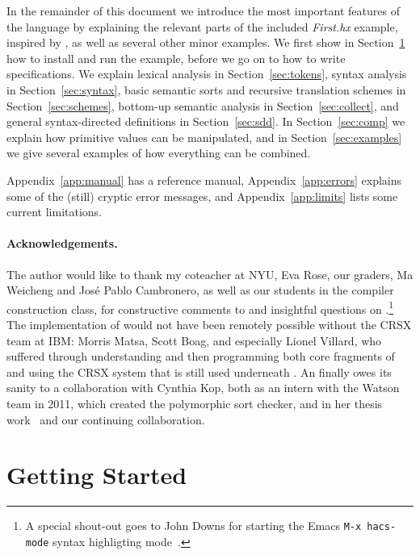 \documentclass[11pt]{article} %
\begin{document}
In the remainder of this document we introduce the most important features of the \HAX language by
explaining the relevant parts of the included \emph{First.hx} example, inspired by
\cite[Figure~1.7]{Aho+:2006}, as well as several other minor examples. %
We first show in Section~\ref{sec:run} how to install \HAX and run the example, before we go on to
how to write specifications. %
We explain lexical analysis in Section~\ref{sec:tokens}, %
syntax analysis in Section~\ref{sec:syntax}, %
basic semantic sorts and recursive translation schemes in Section~\ref{sec:schemes}, %
bottom-up semantic analysis in Section~\ref{sec:collect}, %
and general syntax-directed definitions in Section~\ref{sec:sdd}. %
In Section~\ref{sec:comp} we explain how primitive values can be manipulated, %
and in Section~\ref{sec:examples} we give several examples of how everything can be combined.

Appendix~\ref{app:manual} has a reference manual, %
Appendix~\ref{app:errors} explains some of the (still) cryptic error messages, %
and Appendix~\ref{app:limits} lists some current limitations.

\paragraph*{Acknowledgements.} The author would like to thank my coteacher at NYU, Eva Rose, our
graders, Ma Weicheng and José Pablo Cambronero, as well as our students in the compiler construction
class, for constructive comments to and insightful questions on \HAX.\footnote{A special shout-out
  goes to John Downs for starting the Emacs \texttt{M-x hacs-mode} syntax highligting
  mode~\cite{git:hacsel}.}
The implementation of \HAX would not have been remotely possible without the CRSX team at IBM:
Morris Matsa, Scott Boag, and especially Lionel Villard, who suffered through understanding and then
programming both core fragments of and using the CRSX system that is still used underneath \HAX.
An finally \HAX owes its sanity to a collaboration with Cynthia Kop, both as an intern with the
Watson team in 2011, which created the polymorphic sort checker, and in her thesis
work~\cite{Kop:2012} and our continuing collaboration.


\section{Getting Started}
\label{sec:run}
\end{document}
